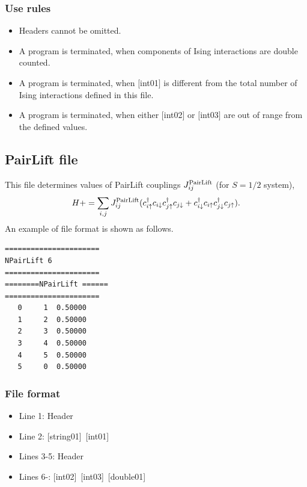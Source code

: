 \subsubsection{Use rules}
\begin{itemize}
\item Headers cannot be omitted. 
\item A program is terminated, when components of Ising interactions are double counted.
\item A program is terminated, when $[$int01$]$ is different from the total number of Ising interactions defined in this file.
\item A program is terminated, when either $[$int02$]$ or $[$int03$]$ are out of range from the defined values.
\end{itemize}


\newpage
\subsection{PairLift file}
\label{Subsec:pairlift}
This file determines values of PairLift couplings $J_{ij}^{\rm PairLift}$ {(for $S=1/2$ system)},
\begin{equation}
H+=\sum_{i,j}J_{ij}^{\rm PairLift} (c_ {i \uparrow}^{\dag}c_{i\downarrow}c_{j \uparrow}^{\dag}c_{j \downarrow}+c_ {i \downarrow}^{\dag}c_{i\uparrow}c_{j \downarrow}^{\dag}c_{j \uparrow}).
\end{equation}
An example of file format is shown as follows.

\begin{minipage}{12.5cm}
\begin{screen}
\begin{verbatim}
====================== 
NPairLift 6  
====================== 
========NPairLift ====== 
====================== 
   0     1  0.50000
   1     2  0.50000
   2     3  0.50000
   3     4  0.50000
   4     5  0.50000
   5     0  0.50000
\end{verbatim}
\end{screen}
\end{minipage}

\subsubsection{File format}
 \begin{itemize}
   \item  Line 1:  Header
   \item  Line 2:   [string01]~[int01]
   \item  Lines 3-5:  Header
   \item  Lines 6-: 
   [int02]~[int03]~[double01] 
  \end{itemize}

